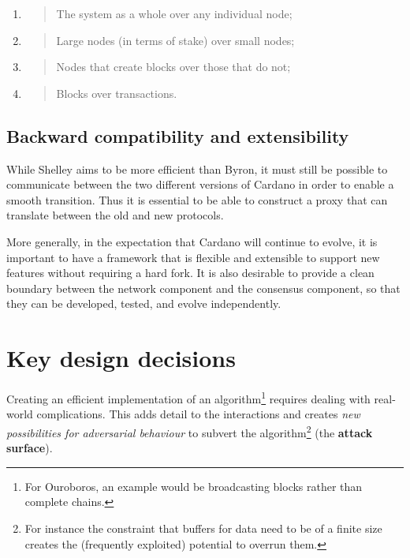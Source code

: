 \documentclass[11pt,a4paper]{article}
\begin{document}
\begin{enumerate}
\def\labelenumi{\arabic{enumi}.}
\item
  \begin{quote}
  The system as a whole over any individual node;
  \end{quote}
\item
  \begin{quote}
  Large nodes (in terms of stake) over small nodes;
  \end{quote}
\item
  \begin{quote}
  Nodes that create blocks over those that do not;
  \end{quote}
\item
  \begin{quote}
  Blocks over transactions.
  \end{quote}
\end{enumerate}

\subsection{Backward compatibility and extensibility}
\label{backward-compatibility-and-extensibility}

While Shelley aims to be more efficient than Byron, it must still be
possible to communicate between the two different versions of Cardano in
order to enable a smooth transition. Thus it is essential to be able to
construct a proxy that can translate between the old and new protocols.

More generally, in the expectation that Cardano will continue to evolve,
it is important to have a framework that is flexible and extensible to
support new features without requiring a hard fork. It is also desirable
to provide a clean boundary between the network component and the
consensus component, so that they can be developed, tested, and evolve
independently.

\section{Key design decisions}
\label{key-design-decisions}

Creating an efficient implementation of an algorithm\footnote{For
  Ouroboros, an example would be broadcasting blocks rather than
  complete chains.} requires dealing with real-world complications. This
adds detail to the interactions and creates \emph{new possibilities for
adversarial behaviour} to subvert the algorithm\footnote{For instance
  the constraint that buffers for data need to be of a finite size
  creates the (frequently exploited) potential to overrun them.} (the
\textbf{attack surface}).
\end{document}
